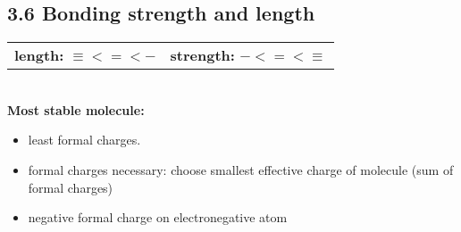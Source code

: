 \subsection{3.6 Bonding strength and length}
    \begin{tabular}{c c}
        \textbf{length:} $\equiv < = < -$ & \textbf{strength:} $- < = < \equiv$\\
    \end{tabular}
    \vspace*{0.5em}\\
    \textbf{Most stable molecule:}
    \vspace*{-0.5em}
    \begin{itemize}
        \itemsep0em
        \item least formal charges.
        \item formal charges necessary: choose smallest effective charge of molecule (sum of formal charges)
        \item negative formal charge on electronegative atom
    \end{itemize}